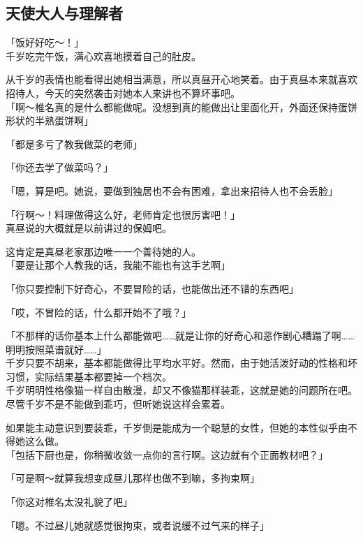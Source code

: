 \subsection{天使大人与理解者}

「饭好好吃～！」\\

千岁吃完午饭，满心欢喜地摸着自己的肚皮。

从千岁的表情也能看得出她相当满意，所以真昼开心地笑着。由于真昼本来就喜欢招待人，今天的突然袭击对她本人来讲也不算坏事吧。\\

「啊～椎名真的是什么都能做呢。没想到真的能做出让里面化开，外面还保持蛋饼形状的半熟蛋饼啊」

「都是多亏了教我做菜的老师」

「你还去学了做菜吗？」

「嗯，算是吧。她说，要做到独居也不会有困难，拿出来招待人也不会丢脸」

「行啊～！料理做得这么好，老师肯定也很厉害吧！」\\

真昼说的大概就是以前讲过的保姆吧。

这肯定是真昼老家那边唯一一个善待她的人。\\

「要是让那个人教我的话，我能不能也有这手艺啊」

「你只要控制下好奇心，不要冒险的话，也能做出还不错的东西吧」

「哎，不冒险的话，什么都开始不了哦？」

「不那样的话你基本上什么都能做吧……就是让你的好奇心和恶作剧心糟蹋了啊……明明按照菜谱就好……」\\

千岁只要不胡来，基本都能做得比平均水平好。然而，由于她活泼好动的性格和坏习惯，实际结果基本都要掉一个档次。\\

千岁明明性格像猫一样自由散漫，却又不像猫那样装乖，这就是她的问题所在吧。尽管千岁不是不能做到乖巧，但听她说这样会累着。

如果能主动意识到要装乖，千岁倒是能成为一个聪慧的女性，但她的本性似乎由不得她这么做。\\

「包括下厨也是，你稍微收敛一点你的言行啊。这边就有个正面教材吧？」

「可是啊～就算我想变成昼儿那样也做不到嘛，多拘束啊」

「你这对椎名太没礼貌了吧」

「嗯。不过昼儿她就感觉很拘束，或者说缓不过气来的样子」\\

